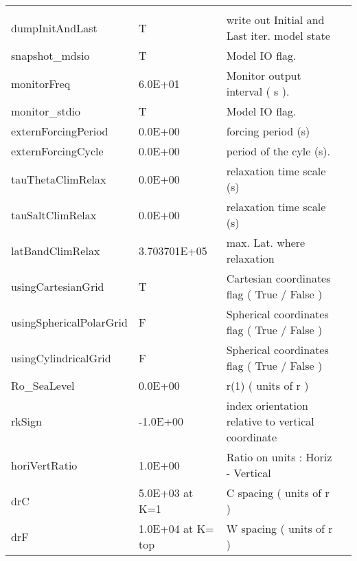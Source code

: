 \begin{table}
\begin{tabular}{lllc}
    &  %
    \\
   dumpInitAndLast  &                     T
    &   write out Initial and Last iter. model state 
    &  %
    \\
   snapshot\_mdsio   &                     T
    &   Model IO flag. 
    &  %
    \\
   monitorFreq   &                   6.0E+01
    &   Monitor output interval ( s ). 
    &  %
    \\
   monitor\_stdio   &                     T
    &   Model IO flag. 
    &  %
    \\
   externForcingPeriod   &                   0.0E+00
    &   forcing period (s) 
    &  %
    \\
   externForcingCycle   &                   0.0E+00
    &   period of the cyle (s). 
    &  %
    \\
   tauThetaClimRelax   &                   0.0E+00
    &   relaxation time scale (s) 
    &  %
    \\
   tauSaltClimRelax   &                   0.0E+00
    &   relaxation time scale (s) 
    &  %
    \\
   latBandClimRelax   &                   3.703701E+05
    &   max. Lat. where relaxation 
    &  %
    \\
   usingCartesianGrid   &                     T
    &   Cartesian coordinates flag ( True / False ) 
    &  %
    \\
   usingSphericalPolarGrid   &                     F
    &   Spherical coordinates flag ( True / False ) 
    &  %
    \\
   usingCylindricalGrid   &                     F
    &   Spherical coordinates flag ( True / False ) 
    &  %
    \\
   Ro\_SeaLevel   &                   0.0E+00
    &   r(1) ( units of r ) 
    &  %
    \\
   rkSign   &                  -1.0E+00
    &   index orientation relative to vertical coordinate 
    &  %
    \\
   horiVertRatio   &                   1.0E+00
    &   Ratio on units : Horiz - Vertical 
    &  %
    \\
   drC   &                   5.0E+03 at K=1
    &   C spacing ( units of r ) 
    &  %
    \\
   drF   &      1.0E+04 at K= top
    &   W spacing ( units of r ) 
    &  %
    \\

\end{tabular}
\end{table}
